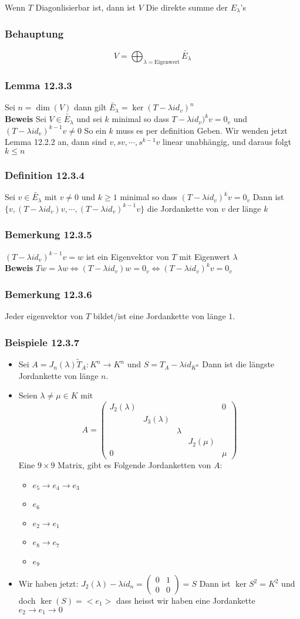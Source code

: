 \documentclass{article}
\newcommand{\beweis}{\\\textbf{Beweis }}
\newcommand{\beispiel}[1]{\subsubsection*{Beispiele {#1}}}
\newcommand{\bemerkung}[1]{\subsubsection*{Bemerkung {#1}}}
\newcommand{\lemma}[1]{\subsubsection*{Lemma {#1}}}
\newcommand{\definition}[1]{\subsubsection*{Definition {#1}}}
\newcommand{\behauptung}[1]{\subsubsection*{Behauptung {#1}}}
\begin{document}
Wenn $T$ Diagonlisierbar ist, dann ist $V$ Die direkte summe der $E_\lambda$'s
\behauptung{} \[V=\bigoplus_{\lambda=\text{Eigenwert}}\tilde{E_\lambda}\]
\lemma{12.3.3} Sei $n=\dim(V)$ dann gilt $\tilde{E_\lambda}=\ker(T-\lambda id_v)^n$
\beweis Sei $V\in \tilde{E_\lambda}$ und sei $k$ minimal so dass $T-\lambda id_v)^kv=0_v$ und $(T-\lambda id_v)^{k-1}v\neq 0$ So ein $k$ muss es per definition Geben. Wir wenden jetzt Lemma 12.2.2 an, dann sind 
$v,sv,\cdots,s^{k-1}v$ linear unabhängig, und daraus folgt $k\le n$
\definition{12.3.4} Sei $v\in \tilde{E_\lambda}$ mit $v\neq 0$ und $k\ge1$ minimal so dass $(T-\lambda id_v)^kv=0_v$ Dann ist $\lbrace v,(T-\lambda id_v)v, \cdots ,(T-\lambda id_v)^{k-1}v\rbrace$ die Jordankette von $v$ der länge $k$
\bemerkung{12.3.5} $(T-\lambda id_v)^{k-1}v=w$ ist ein Eigenvektor von $T$ mit Eigenwert $\lambda$
\beweis $Tw=\lambda w\Leftrightarrow (T-\lambda id_v)w=0_v\Leftrightarrow (T-\lambda id_v)^k v=0_v$
\bemerkung{12.3.6} Jeder eigenvektor von $T$ bildet/ist eine Jordankette von länge $1$.
\beispiel{12.3.7}\begin{itemize}
  \item{Sei $A=J_n(\lambda)\tilde T_A:K^n\rightarrow K^n$ und $S=T_A-\lambda id_{K^n}$ Dann ist die längste Jordankette von länge $n$.}
  \item{Seien $\lambda\neq\mu\in K$ mit \[A=\begin{pmatrix}J_2(\lambda)& & & &0\\ &J_3(\lambda)& & & \\ & & \lambda & & \\ & & & J_2(\mu) & \\0& & & & \mu\end{pmatrix}\] Eine $9\times9$ Matrix, gibt es Folgende Jordanketten von $A$:
    \begin{multicols}{2}\begin{itemize}
      \item[]{$e_5\rightarrow e_4\rightarrow e_3$}
      \item[]{$e_6$}
      \item[]{$e_2\rightarrow e_1$}
      \item[]{$e_8\rightarrow e_7$}
      \item[]{$e_9$}
    \end{itemize}
  \end{multicols}}
\item{Wir haben jetzt: $J_2(\lambda)-\lambda id_n=\begin{pmatrix}0&1\\0&0\end{pmatrix}=S$ Dann ist $\ker{S^2}=K^2$ und doch $\ker(S)=<e_1>$ dass heisst wir haben eine Jordankette $e_2\rightarrow e_1\rightarrow 0$}
\end{itemize}
\end{document}
